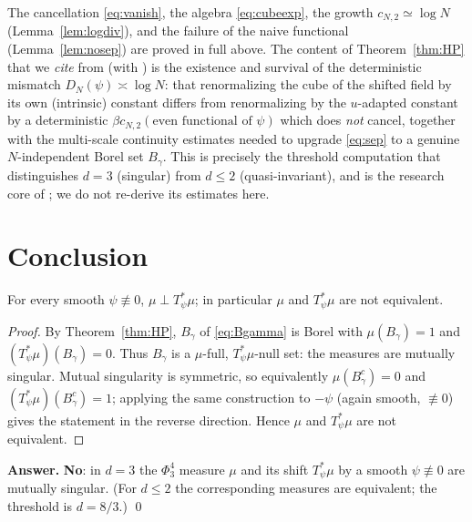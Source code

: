 \begin{remark}
The cancellation \eqref{eq:vanish}, the algebra \eqref{eq:cubeexp}, the growth
$c_{N,2}\simeq\log N$ (Lemma~\ref{lem:logdiv}), and the failure of the naive functional
(Lemma~\ref{lem:nosep}) are proved in full above. The content of
Theorem~\ref{thm:HP} that we \emph{cite} from \cite{HP25} (with \cite{HKN24}) is the
existence and survival of the deterministic mismatch $D_N(\psi)\asymp\log N$: that
renormalizing the cube of the shifted field by its own (intrinsic) constant differs
from renormalizing by the $u$-adapted constant by a deterministic
$\beta c_{N,2}(\text{even functional of }\psi)$ which does \emph{not} cancel, together
with the multi-scale continuity estimates needed to upgrade \eqref{eq:sep} to a genuine
$N$-independent Borel set $B_\gamma$. This is precisely the threshold computation that
distinguishes $d=3$ (singular) from $d\le2$ (quasi-invariant), and is the research core
of \cite{HP25}; we do not re-derive its estimates here.
\end{remark}

\section*{Conclusion}

\begin{qonetheorem}\label{thm:main}
For every smooth $\psi\not\equiv0$, $\mu\perp T_\psi^*\mu$; in particular $\mu$ and
$T_\psi^*\mu$ are not equivalent.
\end{qonetheorem}
\begin{proof}
By Theorem~\ref{thm:HP}, $B_\gamma$ of \eqref{eq:Bgamma} is Borel with $\mu(B_\gamma)=1$
and $(T_\psi^*\mu)(B_\gamma)=0$. Thus $B_\gamma$ is a $\mu$-full, $T_\psi^*\mu$-null set:
the measures are mutually singular. Mutual singularity is symmetric, so equivalently
$\mu(B_\gamma^c)=0$ and $(T_\psi^*\mu)(B_\gamma^c)=1$; applying the same construction to
$-\psi$ (again smooth, $\not\equiv0$) gives the statement in the reverse direction.
Hence $\mu$ and $T_\psi^*\mu$ are not equivalent.
\end{proof}

\medskip
\noindent\textbf{Answer.} \textbf{No}: in $d=3$ the $\Phi^4_3$ measure $\mu$ and its
shift $T_\psi^*\mu$ by a smooth $\psi\not\equiv0$ are mutually singular. (For $d\le2$
the corresponding measures are equivalent; the threshold is $d=8/3$.)
\qed

